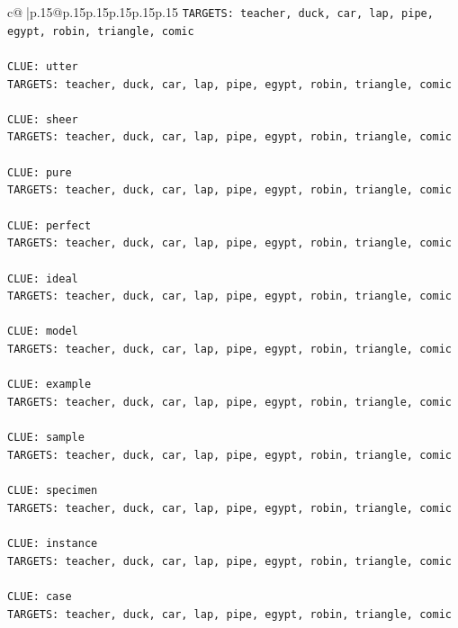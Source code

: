 \documentclass{article}
\begin{document}
{\begin{supertabular}{c@{$\;$}|p{.15\linewidth}@{}p{.15\linewidth}p{.15\linewidth}p{.15\linewidth}p{.15\linewidth}p{.15\linewidth}}
{{{\texttt{TARGETS: teacher, duck, car, lap, pipe, egypt, robin, triangle, comic} \\
\\ 
\texttt{CLUE: utter} \\
\texttt{TARGETS: teacher, duck, car, lap, pipe, egypt, robin, triangle, comic} \\
\\ 
\texttt{CLUE: sheer} \\
\texttt{TARGETS: teacher, duck, car, lap, pipe, egypt, robin, triangle, comic} \\
\\ 
\texttt{CLUE: pure} \\
\texttt{TARGETS: teacher, duck, car, lap, pipe, egypt, robin, triangle, comic} \\
\\ 
\texttt{CLUE: perfect} \\
\texttt{TARGETS: teacher, duck, car, lap, pipe, egypt, robin, triangle, comic} \\
\\ 
\texttt{CLUE: ideal} \\
\texttt{TARGETS: teacher, duck, car, lap, pipe, egypt, robin, triangle, comic} \\
\\ 
\texttt{CLUE: model} \\
\texttt{TARGETS: teacher, duck, car, lap, pipe, egypt, robin, triangle, comic} \\
\\ 
\texttt{CLUE: example} \\
\texttt{TARGETS: teacher, duck, car, lap, pipe, egypt, robin, triangle, comic} \\
\\ 
\texttt{CLUE: sample} \\
\texttt{TARGETS: teacher, duck, car, lap, pipe, egypt, robin, triangle, comic} \\
\\ 
\texttt{CLUE: specimen} \\
\texttt{TARGETS: teacher, duck, car, lap, pipe, egypt, robin, triangle, comic} \\
\\ 
\texttt{CLUE: instance} \\
\texttt{TARGETS: teacher, duck, car, lap, pipe, egypt, robin, triangle, comic} \\
\\ 
\texttt{CLUE: case} \\
\texttt{TARGETS: teacher, duck, car, lap, pipe, egypt, robin, triangle, comic} \\
}}}
\end{supertabular}}
\end{document}
